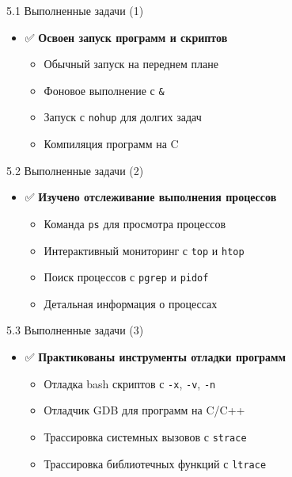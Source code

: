 \documentclass[
  ignorenonframetext,
  aspectratio=169,
  russian,
]{beamer}
\providecommand{\tightlist}{%
  \setlength{\itemsep}{0pt}\setlength{\parskip}{0pt}}
\begin{document}
\begin{frame}[fragile]{5.1 Выполненные задачи (1)}
\label{ux432ux44bux43fux43eux43bux43dux435ux43dux43dux44bux435-ux437ux430ux434ux430ux447ux438-1}
\begin{itemize}[<+->]
\tightlist
\item
  ✅ \textbf{Освоен запуск программ и скриптов}

  \begin{itemize}[<+->]
  \tightlist
  \item
    Обычный запуск на переднем плане
  \item
    Фоновое выполнение с \texttt{\&}
  \item
    Запуск с \texttt{nohup} для долгих задач
  \item
    Компиляция программ на C
  \end{itemize}
\end{itemize}
\end{frame}

\begin{frame}[fragile]{5.2 Выполненные задачи (2)}
\label{ux432ux44bux43fux43eux43bux43dux435ux43dux43dux44bux435-ux437ux430ux434ux430ux447ux438-2}
\begin{itemize}[<+->]
\tightlist
\item
  ✅ \textbf{Изучено отслеживание выполнения процессов}

  \begin{itemize}[<+->]
  \tightlist
  \item
    Команда \texttt{ps} для просмотра процессов
  \item
    Интерактивный мониторинг с \texttt{top} и \texttt{htop}
  \item
    Поиск процессов с \texttt{pgrep} и \texttt{pidof}
  \item
    Детальная информация о процессах
  \end{itemize}
\end{itemize}
\end{frame}

\begin{frame}[fragile]{5.3 Выполненные задачи (3)}
\label{ux432ux44bux43fux43eux43bux43dux435ux43dux43dux44bux435-ux437ux430ux434ux430ux447ux438-3}
\begin{itemize}[<+->]
\tightlist
\item
  ✅ \textbf{Практикованы инструменты отладки программ}

  \begin{itemize}[<+->]
  \tightlist
  \item
    Отладка bash скриптов с \texttt{-x}, \texttt{-v}, \texttt{-n}
  \item
    Отладчик GDB для программ на C/C++
  \item
    Трассировка системных вызовов с \texttt{strace}
  \item
    Трассировка библиотечных функций с \texttt{ltrace}
  \end{itemize}
\end{itemize}
\end{frame}
\end{document}

